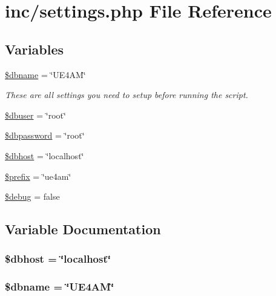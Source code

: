 \hypertarget{settings_8php}{\section{inc/settings.php File Reference}
\label{settings_8php}
}
\subsection*{Variables}
\begin{DoxyCompactItemize}
\item 
\hyperlink{settings_8php_ac5111a571fffa2499732833bb7f0d8c1}{\$dbname} = \char`\"{}U\-E4\-A\-M\char`\"{}
\begin{DoxyCompactList}\small\item\em These are all settings you need to setup before running the script. \end{DoxyCompactList}\item 
\hyperlink{settings_8php_a8d5ac1c3396a540f025f9bbe56a5b568}{\$dbuser} = \char`\"{}root\char`\"{}
\item 
\hyperlink{settings_8php_a0d42c2db361e096182a30d694e0cd6e4}{\$dbpassword} = \char`\"{}root\char`\"{}
\item 
\hyperlink{settings_8php_a580dd98ba7f04c133d1a1e1b01af4a30}{\$dbhost} = \char`\"{}localhost\char`\"{}
\item 
\hyperlink{settings_8php_a09e8cf95b9d29955a0bfabca9b420edc}{\$prefix} = \char`\"{}ue4am\char`\"{}
\item 
\hyperlink{settings_8php_a85ae3e64cd40e9564adceb010085e9dd}{\$debug} = false
\end{DoxyCompactItemize}


\subsection{Variable Documentation}
\hypertarget{settings_8php_a580dd98ba7f04c133d1a1e1b01af4a30}{
\subsubsection[{\$dbhost}]{\setlength{\rightskip}{0pt plus 5cm}\$dbhost = \char`\"{}localhost\char`\"{}}}\label{settings_8php_a580dd98ba7f04c133d1a1e1b01af4a30}
\hypertarget{settings_8php_ac5111a571fffa2499732833bb7f0d8c1}{
\subsubsection[{\$dbname}]{\setlength{\rightskip}{0pt plus 5cm}\$dbname = \char`\"{}U\-E4\-A\-M\char`\"{}}}\label{settings_8php_ac5111a571fffa2499732833bb7f0d8c1}


